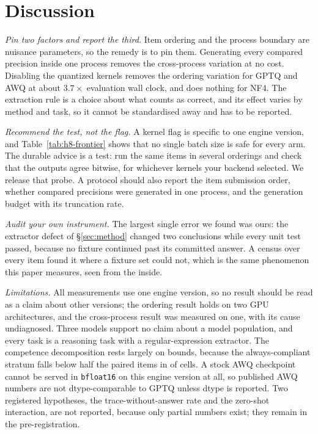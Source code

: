 \documentclass[conference]{IEEEtran}
\begin{document}
\section{Discussion}
\label{sec:discussion}

\emph{Pin two factors and report the third.} Item ordering and the process boundary are
nuisance parameters, so the remedy is to pin them. Generating every compared precision inside
one process removes the cross-process variation at no cost. Disabling the quantized kernels
removes the ordering variation for GPTQ and AWQ at about $3.7\times$ evaluation wall clock,
and does nothing for NF4. The extraction rule is a choice about what counts as correct, and its
effect varies by method and task, so it cannot be standardised away and has to be reported.

\emph{Recommend the test, not the flag.} A kernel flag is specific to one engine version, and
Table~\ref{tab:h8-frontier} shows that no single batch size is safe for every arm. The
durable advice is a test: run the same items in several orderings and check that the outputs
agree bitwise, for whichever kernels your backend selected. We release that probe. A protocol
should also report the item submission order, whether compared precisions were generated in
one process, and the generation budget with its truncation rate.

\emph{Audit your own instrument.} The largest single error we found was ours: the extractor
defect of \S\ref{sec:method} changed two conclusions while every unit test passed, because no
fixture continued past its committed answer. A census over every item found it where a fixture
set could not, which is the same phenomenon this paper measures, seen from the inside.

\emph{Limitations.} All measurements use one engine version, so no result should be read as a
claim about other versions; the ordering result holds on two GPU architectures, and the
cross-process result was measured on one, with its cause undiagnosed. Three models support no
claim about a model population, and every task is a reasoning task with a regular-expression
extractor. The competence decomposition rests largely on bounds, because the always-compliant
stratum falls below half the paired items in \hFourStratumBelowHalf{} of \hFourStratumCells{}
cells. A stock AWQ checkpoint cannot be served in \texttt{bfloat16} on this engine version at
all, so published AWQ numbers are not dtype-comparable to GPTQ unless dtype is reported. Two
registered hypotheses, the trace-without-answer rate and the zero-shot interaction, are not
reported, because only partial numbers exist; they remain in the pre-registration.
\end{document}
